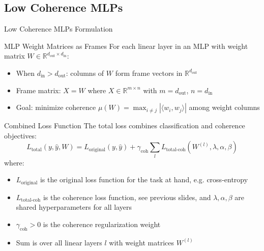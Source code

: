 \documentclass[9pt,dvipsnames]{beamer}
\begin{document}
\subsection{Low Coherence MLPs}
\begin{frame}{Low Coherence MLPs Formulation}

	\begin{block}{MLP Weight Matrices as Frames}
		For each linear layer in an MLP with weight matrix $W \in \mathbb{R}^{d_{\text{out}} \times d_{\text{in}}}$:
		\begin{itemize}
			\item When $d_{\text{in}} > d_{\text{out}}$: columns of $W$ form frame vectors in $\mathbb{R}^{d_{\text{out}}}$
			\item Frame matrix: $X = W$ where $X \in \mathbb{R}^{m \times n}$ with $m = d_{\text{out}}$, $n = d_{\text{in}}$
			\item Goal: minimize coherence $\mu(W) = \max_{i \neq j} |\langle w_i, w_j \rangle|$ among weight columns
		\end{itemize}
	\end{block}

	\begin{block}{Combined Loss Function}
		The total loss combines classification and coherence objectives:
		\begin{equation*}
			L_{\text{total}}(y, \hat{y}, W) = L_{\text{original}}(y, \hat{y}) + \gamma_{\text{coh}} \sum_{l} L_{\text{total-coh}}(W^{(l)}, \lambda, \alpha, \beta)
		\end{equation*}
		where:
		\begin{itemize}
			\item $L_{\text{original}}$ is the original loss function for the task at hand, e.g. cross-entropy
			\item $L_{\text{total-coh}}$ is the coherence loss function, see previous slides, and $\lambda, \alpha, \beta$ are shared hyperparameters for all layers
			\item $\gamma_{\text{coh}} > 0$ is the coherence regularization weight
			\item Sum is over all linear layers $l$ with weight matrices $W^{(l)}$
		\end{itemize}
	\end{block}

\end{frame}
\end{document}

